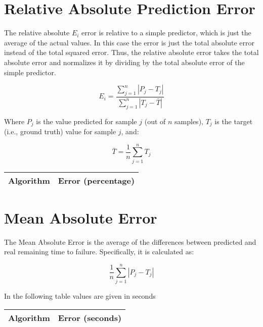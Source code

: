 \documentclass[10pt,a4paper]{article}
\begin{document}
\section{Relative Absolute Prediction Error}

The relative absolute $E_i$ error is relative to a simple predictor, which is just the average of the actual values. In this case the error is just the total absolute error instead of the total squared error. Thus, the relative absolute error takes the total absolute error and normalizes it by dividing by the total absolute error of the simple predictor.

\begin{equation}
E_i = \frac{\sum_{j=1}^n | P_j - T_j | }{\sum_{j=1}^n | T_j - \bar{T} | }
\end{equation}

Where $P_j$ is the value predicted for sample $j$ (out of $n$ samples), $T_j$ is the target (i.e., ground truth) value for sample $j$, and:

\begin{equation}
\bar{T} =  \frac{1}{n} \sum_{j=1}^n T_j
\end{equation}


\begin{center}
\begin{tabular}{cc}
\toprule
\textbf{Algorithm} & \textbf{Error (percentage)} \\
\midrule

\bottomrule
\end{tabular}
\end{center}



\section{Mean Absolute Error}

The Mean Absolute Error is the average of the differences between predicted and real remaining time to failure. Specifically, it is calculated as:

\begin{equation}
\frac{1}{n} \sum_{j=1}^n |P_j - T_j|
\end{equation}

In the following table values are given in seconds

\begin{center}
\begin{tabular}{cc}
\toprule
\textbf{Algorithm} & \textbf{Error (seconds)} \\
\midrule

\bottomrule
\end{tabular}
\end{center}
\end{document}
